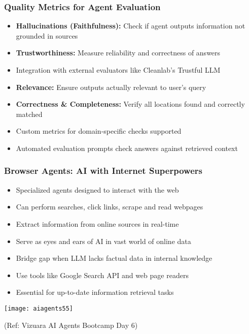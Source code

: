 \begin{frame}[fragile]\frametitle{Quality Metrics for Agent Evaluation}

      \begin{itemize}
		\item \textbf{Hallucinations (Faithfulness):} Check if agent outputs information not grounded in sources
		\item \textbf{Trustworthiness:} Measure reliability and correctness of answers
		\item Integration with external evaluators like Cleanlab's Trustful LLM
		\item \textbf{Relevance:} Ensure outputs actually relevant to user's query
		\item \textbf{Correctness \& Completeness:} Verify all locations found and correctly matched
		\item Custom metrics for domain-specific checks supported
		\item Automated evaluation prompts check answers against retrieved context
	  \end{itemize}

\end{frame}

\begin{frame}[fragile]\frametitle{Browser Agents: AI with Internet Superpowers}
      \begin{itemize}
		\item Specialized agents designed to interact with the web
		\item Can perform searches, click links, scrape and read webpages
		\item Extract information from online sources in real-time
		\item Serve as eyes and ears of AI in vast world of online data
		\item Bridge gap when LLM lacks factual data in internal knowledge
		\item Use tools like Google Search API and web page readers
		\item Essential for up-to-date information retrieval tasks
	  \end{itemize}
		\begin{center}
		\texttt{[image: aiagents55]}
		
		{\tiny (Ref: Vizuara AI Agents Bootcamp Day 6)}
		\end{center}	
\end{frame}

